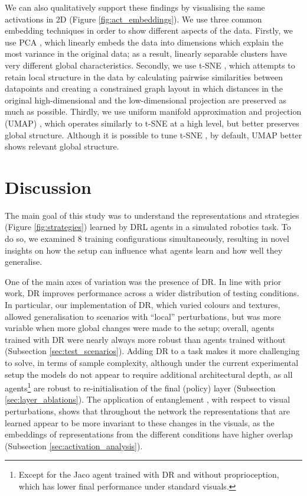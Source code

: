 We can also qualitatively support these findings by visualising the same
activations in 2D (Figure \ref{fig:act_embeddings}). We use three common
embedding techniques in order to show different aspects of the data.
Firstly, we use PCA \cite{pearson1901liii}, which linearly embeds the
data into dimensions which explain the most variance in the original
data; as a result, linearly separable clusters have very different
global characteristics. Secondly, we use t-SNE
\cite{maaten2008visualizing}, which attempts to retain local structure
in the data by calculating pairwise similarities between datapoints and
creating a constrained graph layout in which distances in the original
high-dimensional and the low-dimensional projection are preserved as
much as possible. Thirdly, we use uniform manifold approximation and
projection (UMAP) \cite{mcinnes2018umap}, which operates similarly to
t-SNE at a high level, but better preserves global structure. Although
it is possible to tune t-SNE \cite{wattenberg2016use}, by default, UMAP
better shows relevant global structure.

\hypertarget{discussion}{%
\section{Discussion}\label{discussion}}

\label{sec:discussion}

The main goal of this study was to understand the representations and
strategies (Figure \ref{fig:strategies}) learned by DRL agents in a
simulated robotics task. To do so, we examined 8 training configurations
simultaneously, resulting in novel insights on how the setup can
influence what agents learn and how well they generalise.

One of the main axes of variation was the presence of DR. In line with
prior work, DR improves performance across a wider distribution of
testing conditions. In particular, our implementation of DR, which
varied colours and textures, allowed generalisation to scenarios with
``local'' perturbations, but was more variable when more global changes
were made to the setup; overall, agents trained with DR were nearly
always more robust than agents trained without (Subsection
\ref{sec:test_scenarios}). Adding DR to a task makes it more challenging
to solve, in terms of sample complexity, although under the current
experimental setup the models do not appear to require additional
architectural depth, as all agents\footnote{Except for the Jaco agent
  trained with DR and without proprioception, which has lower final
  performance under standard visuals.} are robust to re-initialisation
of the final (policy) layer (Subsection \ref{sec:layer_ablations}). The
application of entanglement \cite{frosst2019analyzing}, with respect to
visual perturbations, shows that throughout the network the
representations that are learned appear to be more invariant to these
changes in the visuals, as the embeddings of representations from the
different conditions have higher overlap (Subsection
\ref{sec:activation_analysis}).

